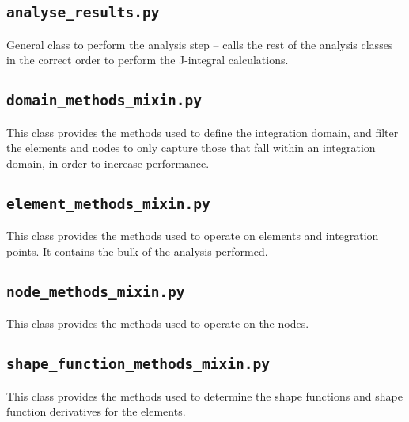 \subsection{\texttt{analyse\_results.py}}

General class to perform the analysis step -- calls the rest of the analysis classes in the correct order to perform the J-integral calculations.



\newpage
\subsection{\texttt{domain\_methods\_mixin.py}}

This class provides the methods used to define the integration domain, and filter the elements and nodes to only capture those that fall within an integration domain, in order to increase performance.



\newpage
\subsection{\texttt{element\_methods\_mixin.py}}

This class provides the methods used to operate on elements and integration points. It contains the bulk of the analysis performed.




\newpage
\subsection{\texttt{node\_methods\_mixin.py}}

This class provides the methods used to operate on the nodes.



\newpage
\subsection{\texttt{shape\_function\_methods\_mixin.py}}

This class provides the methods used to determine the shape functions and shape function derivatives for the elements.

